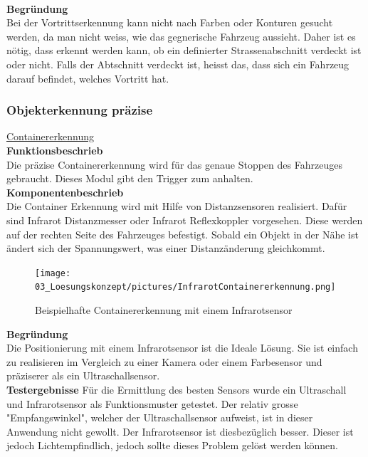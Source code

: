 \\[0.2cm]
\textbf{Begründung}\\
Bei der Vortrittserkennung kann nicht nach Farben oder Konturen gesucht werden, da man nicht weiss, wie das gegnerische Fahrzeug aussieht. Daher ist es nötig, dass erkennt werden kann, ob ein definierter Strassenabschnitt verdeckt ist oder nicht. Falls der Abtschnitt verdeckt ist, heisst das, dass sich ein Fahrzeug darauf befindet, welches Vortritt hat.
\subsubsection{Objekterkennung präzise}
\underline{Containererkennung}\\[0.2cm]
\textbf{Funktionsbeschrieb}\\[0.2cm]
Die präzise Containererkennung wird für das genaue Stoppen des Fahrzeuges gebraucht. Dieses Modul gibt den Trigger zum anhalten.\\[0.2cm]
\textbf{Komponentenbeschrieb}\\[0.2cm]
Die Container Erkennung wird mit Hilfe von Distanzsensoren realisiert. Dafür sind Infrarot Distanzmesser oder Infrarot Reflexkoppler vorgesehen. Diese werden auf der rechten Seite des Fahrzeuges befestigt. Sobald ein Objekt in der Nähe ist ändert sich der Spannungswert, was einer Distanzänderung gleichkommt. 
\begin{figure} [H]
	\centering
	\texttt{[image: 03\_Loesungskonzept/pictures/InfrarotContainererkennung.png]}
	\caption{Beispielhafte Containererkennung mit einem Infrarotsensor}
\end{figure}
\textbf{Begründung}\\[0.2cm]
Die Positionierung mit einem Infrarotsensor ist die Ideale Lösung. Sie ist einfach zu realisieren im Vergleich zu einer Kamera oder einem Farbesensor und präziserer als ein Ultraschallsensor.\\[0.2cm]
\textbf{Testergebnisse}
Für die Ermittlung des besten Sensors wurde ein Ultraschall und Infrarotsensor als Funktionsmuster getestet. Der relativ grosse "Empfangswinkel", welcher der Ultraschallsensor aufweist, ist in dieser Anwendung nicht gewollt. Der Infrarotsensor ist diesbezüglich besser. Dieser ist jedoch Lichtempfindlich, jedoch sollte dieses Problem gelöst werden können.\\[0.2cm]

